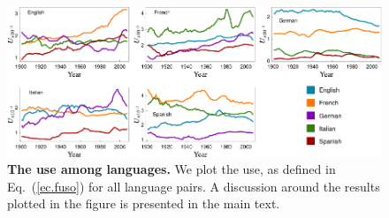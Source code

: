 \documentclass[10pt,letterpaper]{article} %
\newcommand{\eref}[1]{Eq.~(\ref{#1})}
\begin{document}





\begin{figure}[!h]
	\begin{adjustwidth}{-2cm}{1cm}
		\centering
		\includegraphics{images/usoFinal.pdf}
		\caption{{\bf The use among languages.} 
We plot the use, as defined in \eref{ec.fuso} for all language pairs. 
A discussion around the results plotted in the figure is presented in the
main text. }
		\label{fig.UT_art}
	\end{adjustwidth}
\end{figure}
\end{document}

